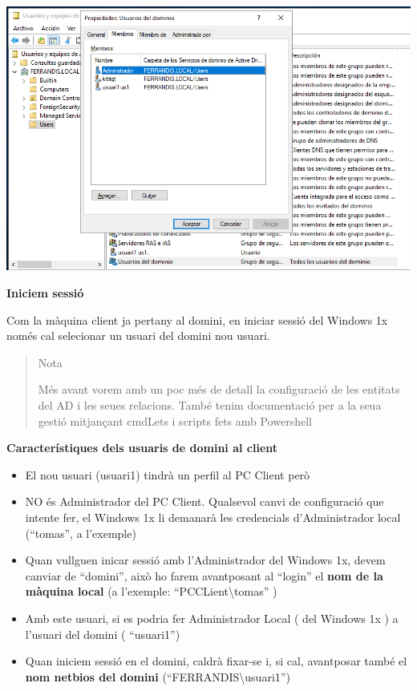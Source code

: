 \documentclass[
  a4paper,
]{article}
\begin{document}
\includegraphics{png/grupousuariosdeldominio.png}

\textbf{Iniciem sessió}

Com la màquina client ja pertany al domini, en iniciar sessió del
Windows 1x només cal selecionar un usuari del domini nou usuari.

\begin{quote}
Nota

Més avant vorem amb un poc més de detall la configuració de les entitats
del AD i les seues relacions. També tenim documentació per a la seua
gestió mitjançant cmdLets i scripts fets amb Powershell
\end{quote}

\textbf{Característiques dels usuaris de domini al client}

\begin{itemize}
\item
  El nou usuari (usuari1) tindrà un perfil al PC Client però
\item
  NO és Administrador del PC Client. Qualsevol canvi de configuració que
  intente fer, el Windows 1x li demanarà les credencials d'Administrador
  local (``tomas'', a l'exemple)
\item
  Quan vullguen inicar sessió amb l'Administrador del Windows 1x, devem
  canviar de ``domini'', això ho farem avantposant al ``login'' el
  \textbf{nom de la màquina local} (a l'exemple:
  ``PCCLient\textbackslash tomas'' )
\item
  Amb este usuari, si es podria fer Administrador Local ( del Windows 1x
  ) a l'usuari del domini ( ``usuari1'')
\item
  Quan iniciem sessió en el domini, caldrà fixar-se i, si cal,
  avantposar també el \textbf{nom netbios del domini}
  (``FERRANDIS\textbackslash usuari1'')
\end{itemize}
\end{document}
